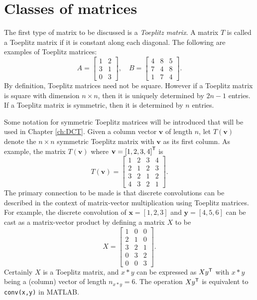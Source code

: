 \section{Classes of matrices} \label{sec:Classes of matrices}
The first type of matrix to be discussed is a \textit{Toeplitz matrix}. A matrix $T$ is called a Toeplitz matrix if it is constant along each diagonal. The following are examples of Toeplitz matrices:
\[A = \begin{bmatrix}
1 & 2 \\
3 & 1 \\
0 & 3
\end{bmatrix}, \quad 
B = \begin{bmatrix}
4 & 8 & 5 \\
7 & 4 & 8 \\
1 & 7 & 4
\end{bmatrix}.\]
By definition, Toeplitz matrices need not be square. However if a Toeplitz matrix is square with dimension $n \times n$, then it is uniquely determined by $2n-1$ entries. If a Toeplitz matrix is symmetric, then it is determined by $n$ entries. \par
Some notation for symmetric Toeplitz matrices will be introduced that will be used in Chapter \ref{ch:DCT}. Given a column vector $\mathbf{v}$ of length $n$, let $T(\mathbf{v})$ denote the $n \times n$ symmetric Toeplitz matrix with $\mathbf{v}$ as its first column. As example, the matrix $T(\mathbf{v})$ where $\mathbf{v} = {[1,2,3,4]}^\mathsf{T}$ is
\[T(\mathbf{v}) = \begin{bmatrix}
1 & 2 & 3 & 4 \\
2 & 1 & 2 & 3 \\
3 & 2 & 1 & 2 \\
4 & 3 & 2 & 1 
\end{bmatrix}.\] 
The primary connection to be made is that discrete convolutions can be described in the context of matrix-vector multiplication using Toeplitz matrices. For example, the discrete convolution of $\mathbf{x} = [1,2,3]$ and $\mathbf{y} = [4,5,6]$ can be cast as a matrix-vector product by defining a matrix $X$ to be
\[X = \begin{bmatrix}
1 & 0 & 0  \\
2 & 1 & 0 \\
3 & 2 & 1 \\
0 & 3 & 2 \\
0 & 0 & 3 
\end{bmatrix}.\]
Certainly $X$ is a Toeplitz matrix, and $x*y$ can be expressed as $X{y}^\mathsf{T}$ with $x*y$ being a (column) vector of length $n_{x*y} = 6$. The operation $X{y}^\mathsf{T}$ is equivalent to \texttt{conv(x,y)} in MATLAB. \par 
